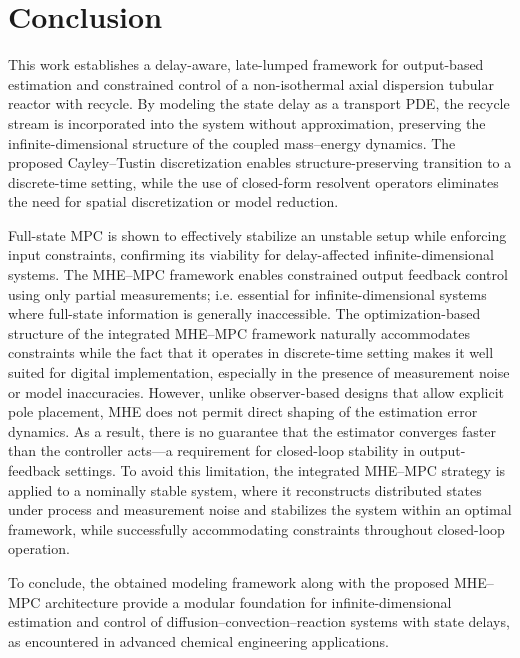 \section{Conclusion} \label{sec:conclusion}

This work establishes a delay-aware, late-lumped framework for output-based estimation and constrained control of a non-isothermal axial dispersion tubular reactor with recycle. By modeling the state delay as a transport PDE, the recycle stream is incorporated into the system without approximation, preserving the infinite-dimensional structure of the coupled mass--energy dynamics. The proposed Cayley--Tustin discretization enables structure-preserving transition to a discrete-time setting, while the use of closed-form resolvent operators eliminates the need for spatial discretization or model reduction.

Full-state MPC is shown to effectively stabilize an unstable setup while enforcing input constraints, confirming its viability for delay-affected infinite-dimensional systems. The MHE--MPC framework enables constrained output feedback control using only partial measurements; i.e. essential for infinite-dimensional systems where full-state information is generally inaccessible. The optimization-based structure of the integrated MHE--MPC framework naturally accommodates constraints while the fact that it operates in discrete-time setting makes it well suited for digital implementation, especially in the presence of measurement noise or model inaccuracies. However, unlike observer-based designs that allow explicit pole placement, MHE does not permit direct shaping of the estimation error dynamics. As a result, there is no guarantee that the estimator converges faster than the controller acts---a requirement for closed-loop stability in output-feedback settings. To avoid this limitation, the integrated MHE--MPC strategy is applied to a nominally stable system, where it reconstructs distributed states under process and measurement noise and stabilizes the system within an optimal framework, while successfully accommodating constraints throughout closed-loop operation.

To conclude, the obtained modeling framework along with the proposed MHE--MPC architecture provide a modular foundation for infinite-dimensional estimation and control of diffusion--convection--reaction systems with state delays, as encountered in advanced chemical engineering applications.